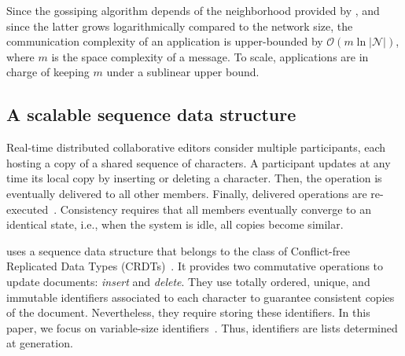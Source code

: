 Since the gossiping algorithm depends of the neighborhood provided by \SPRAY,
and since the latter grows logarithmically compared to the network size, the
communication complexity of an application is upper-bounded by
$\mathcal{O}(m \ln |\mathcal{N}|)$, where $m$ is the space complexity of a
message. To scale, applications are in charge of keeping $m$ under a sublinear
upper bound.




\subsection{A scalable sequence data structure}

Real-time distributed collaborative editors consider multiple participants, each
hosting a copy of a shared sequence of characters. A participant updates at any
time its local copy by inserting or deleting a character. Then, the operation is
eventually delivered to all other members. Finally, delivered operations are
re-executed~\cite{saito2005optimistic}. Consistency requires that all members
eventually converge to an identical state, i.e., when the system is idle, all
copies become similar.

\CRATE uses a sequence data structure that belongs to the class of Conflict-free
Replicated Data Types (CRDTs)~\cite{shapiro2011conflict,
  shapiro2011comprehensive}. It provides two commutative operations to update
documents: \emph{insert} and \emph{delete}.  They use totally ordered, unique,
and immutable identifiers associated to each character to guarantee consistent
copies of the document. Nevertheless, they require storing these identifiers. In
this paper, we focus on variable-size identifiers~\cite{preguica2009commutative,
  weiss2009logoot}. Thus, identifiers are lists determined at generation.

